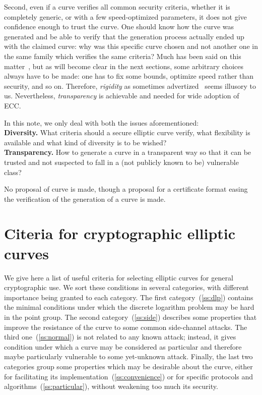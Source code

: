 \documentclass[twocolumn,letterpaper]{article}
\begin{document}
Second, even if a curve verifies all common security criteria,
whether it is completely generic, or with a few speed-optimized parameters,
it does not give confidence enough to trust the curve.
One should know how the curve was generated and be able to verify that the
generation process actually ended up with the claimed curve:
why was this specific curve chosen and not another one in the same family
which verifies the same criteria?
Much has been said on this matter~\cite{safecurves,msr2014bcln,eprint2014brainpool,eprint2013abgr},
but as will become clear in the next sections, some arbitrary choices always have
to be made: one has to fix some bounds, optimize speed rather than security, and so on.
Therefore, \emph{rigidity} as sometimes advertized~\cite{safecurves} seems illusory
to us.
Nevertheless, \emph{transparency} is achievable and needed for wide adoption of ECC.

In this note, we only deal with both the issues aforementioned:\\
{\bf Diversity. }
What criteria should a secure elliptic curve verify, what flexibility is available and what kind of diversity is to be wished?\\
{\bf Transparency. }
How to generate a curve in a transparent way so that it can be trusted and
not suspected to fall in a (not publicly known to be) vulnerable class?

No proposal of curve is made, though a proposal for a certificate format
easing the verification of the generation of a curve is made.

\section{Citeria for cryptographic elliptic curves}
\label{s:criteria}

We give here a list of useful criteria for selecting elliptic curves
for general cryptographic use.
We sort these conditions in several categories,
with different importance being granted to each category.
The first category~(\ref{ss:dlp}) contains the minimal conditions under which
the discrete logarithm problem may be hard in the point group.
The second category~(\ref{ss:side}) describes some properties that improve
the resistance of the curve to some common side-channel attacks.
The third one~(\ref{ss:normal}) is not related to any known attack;
instead, it gives condition under which a curve may be considered
as particular and therefore maybe particularly vulnerable
to some yet-unknown attack.
Finally, the last two categories group some properties
which may be desirable about the curve,
either for facilitating its implementation~(\ref{ss:convenience})
or for specific protocols and algorithms~(\ref{ss:particular}),
without weakening too much its security.
\end{document}
